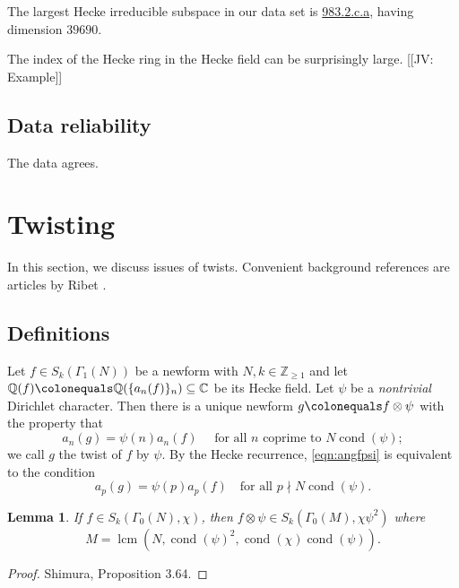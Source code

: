 \documentclass[11pt]{amsart}
\numberwithin{equation}{subsection}
\theoremstyle{plain}
\newtheorem{lem}[equation]{Lemma}
\theoremstyle{definition}
\newcommand{\Q}{\mathbb{Q}}
\newcommand{\Z}{\mathbb{Z}}
\newcommand{\C}{\mathbb{C}}
\newcommand{\defi}[1]{\textsf{#1}} 	%
\DeclareMathOperator{\cond}{cond}
\DeclareMathOperator{\lcm}{lcm}
\newcommand{\jv}[1]{{\color{red} \textsf{[[JV: #1]]}}}
\begin{document}
The largest Hecke irreducible subspace in our data set is \href{http://cmfs.lmfdb.xyz/ModularForm/GL2/Q/holomorphic/983/2/c/a/}{\textsf{983.2.c.a}}, having dimension $39690$.

The index of the Hecke ring in the Hecke field can be surprisingly large.  \jv{Example}

\subsection{Data reliability}

The data agrees.

\section{Twisting} \label{sec:twists}

In this section, we discuss issues of twists.  Convenient background references are articles by Ribet \cite{Ribet:galreps,Ribet:endos}.

\subsection{Definitions}

Let $f \in S_k(\Gamma_1(N))$ be a newform with $N,k \in \Z_{\geq 1}$ and let $\Q(f) \colonequals \Q(\{a_n(f)\}_n) \subseteq \C$ be its Hecke field.  Let $\psi$ be a \emph{nontrivial} Dirichlet character.  Then there is a unique newform $g \colonequals f \otimes \psi$ with the property that 
\begin{equation} \label{eqn:angfpsi}
a_n(g)=\psi(n)a_n(f) \quad \text{ for all $n$ coprime to $N\cond(\psi)$};
\end{equation}
we call $g$ the \defi{twist} of $f$ by $\psi$.  By the Hecke recurrence, \eqref{eqn:angfpsi} is equivalent to the condition 
\begin{equation}
a_p(g)=\psi(p)a_p(f) \quad \text{for all $p \nmid N\cond(\psi)$.}
\end{equation}

\begin{lem} \label{lem:MNchipsi}
If $f \in S_k(\Gamma_0(N),\chi)$, then $f \otimes \psi \in S_k(\Gamma_0(M),\chi\psi^2)$ where
\begin{equation} \label{eqn:MNpsi}
M = \lcm(N,\cond(\psi)^2,\cond(\chi)\cond(\psi)). 
\end{equation}
\end{lem}

\begin{proof}
Shimura, Proposition 3.64.
\end{proof}
\end{document}
